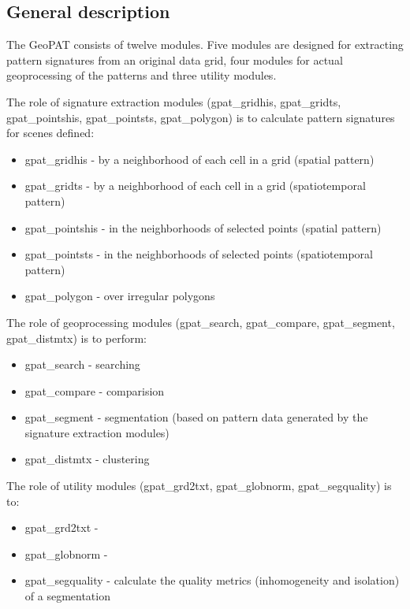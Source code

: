 \subsection{General description}

The GeoPAT consists of twelve modules.
Five modules are designed for extracting pattern signatures from an original data grid, four modules for actual geoprocessing of the patterns and three utility modules.

The role of signature extraction modules (gpat_gridhis, gpat_gridts, gpat_pointshis, gpat_pointsts, gpat_polygon) is to calculate pattern signatures for scenes defined:

\begin{itemize}
  \item gpat_gridhis - by a neighborhood of each cell in a grid (spatial pattern)
  \item gpat_gridts - by a neighborhood of each cell in a grid (spatiotemporal pattern)
  \item gpat_pointshis - in the neighborhoods of selected points (spatial pattern)
  \item gpat_pointsts - in the neighborhoods of selected points (spatiotemporal pattern)
  \item gpat_polygon - over irregular polygons
\end{itemize}

The role of geoprocessing modules (gpat_search, gpat_compare, gpat_segment, gpat_distmtx) is to perform:

\begin{itemize}
  \item gpat_search - searching
  \item gpat_compare - comparision
  \item gpat_segment - segmentation (based on pattern data generated by the signature extraction modules)
  \item gpat_distmtx - clustering
\end{itemize}

The role of utility modules (gpat_grd2txt, gpat_globnorm, gpat_segquality) is to:

\begin{itemize}
  \item gpat_grd2txt - 
  \item gpat_globnorm - 
  \item gpat_segquality - calculate the quality metrics (inhomogeneity and isolation) of a segmentation
\end{itemize}

